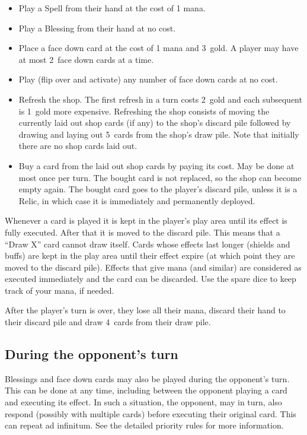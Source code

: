 \documentclass[dvipsnames,parskip,a4paper]{scrartcl}
\newcommand{\facedowncost}{3}
\newcommand{\refreshcost}{2}
\newcommand{\refreshcostincrease}{1}
\newcommand{\handsize}{4}
\newcommand{\dacedownsize}{2}
\newcommand{\shopsize}{5}
\begin{document}
\begin{itemize}
\item Play a Spell from their hand at the cost of 1 mana.
\item Play a Blessing from their hand at no cost.
\item Place a face down card at the cost of 1 mana and \facedowncost \ gold. A player may have at most \dacedownsize \ face down cards at a time.
\item Play (flip over and activate) any number of face down cards at no cost.
\item Refresh the shop. The first refresh in a turn costs \refreshcost \ gold and each subsequent is \refreshcostincrease \ gold more expensive.
Refreshing the shop consists of moving the currently laid out shop cards (if any) to the shop's discard pile followed by drawing and laying out \shopsize \ cards from the shop's draw pile. Note that initially there are no shop cards laid out.
\item Buy a card from the laid out shop cards by paying its cost. May be done at most once per turn.
The bought card is not replaced, so the shop can become empty again. The bought card goes to the player's discard pile, unless it is a Relic, in which case it is immediately and permanently deployed.
\end{itemize}

Whenever a card is played it is kept in the player's play area until its effect is fully executed. After that it is moved to the discard pile. This means that a ``Draw X'' card cannot draw itself. Cards whose effects last longer (shields and buffs) are kept in the play area until their effect expire (at which point they are moved to the discard pile). Effects that give mana (and similar) are considered as executed immediately and the card can be discarded. Use the spare dice to keep track of your mana, if needed.

\vspace{4pt}

After the player's turn is over, they lose all their mana, discard their hand to their discard pile and draw \handsize \ cards from their draw pile.

\subsection*{During the opponent's turn}

Blessings and face down cards may also be played during the opponent's turn. This can be done at any time, including between the opponent playing a card and executing its effect. In such a situation, the opponent, may in turn, also respond (possibly with multiple cards) before executing their original card. This can repeat ad infinitum. See the detailed priority rules for more information.
\end{document}
